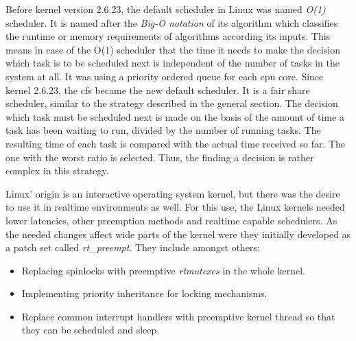 Before kernel version 2.6.23, the default scheduler in Linux was named \textit{O(1)} scheduler. 
It is named after the \textit{Big-O notation} of its algorithm which classifies the runtime or memory requirements of algorithms according its inputs.
This means in case of the O(1) scheduler that the time it needs to make the decision which task is to be scheduled next is independent of the number of tasks in the system at all.
It was using a priority ordered queue for each \ac{cpu} core\cite{lfd430}.
Since kernel 2.6.23, the \ac{cfs} became the new default scheduler.
It is a fair share scheduler, similar to the strategy described in the general section.
The decision which task must be scheduled next is made on the basis of the amount of time a task has been waiting to run, divided by the number of running tasks.
The resulting time of each task is compared with the actual time received so far.
The one with the worst ratio is selected.
Thus, the finding a decision is rather complex in this strategy\cite{lfd430}.

Linux' origin is an interactive operating system kernel, but there was the desire to use it in realtime environments as well. 
For this use, the Linux kernels needed lower latencies, other preemption methods and realtime capable schedulers.
As the needed changes affect wide parts of the kernel were they initially developed as a patch set called \textit{rt\_preempt}.
They include amongst others:
\begin{itemize}
    \item Replacing spinlocks with preemptive \textit{rtmutexes} in the whole kernel.
    \item Implementing priority inheritance for locking mechanisms.
    \item Replace common interrupt handlers with preemptive kernel thread so that they can be scheduled and sleep\cite{lfd430}.
\end{itemize}

